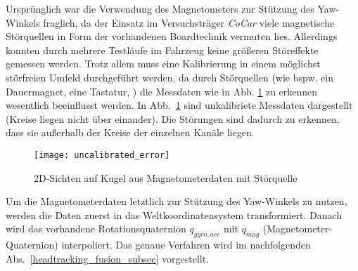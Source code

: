 Ursprünglich war die Verwendung des Magnetometers zur Stützung des Yaw-Winkels fraglich, da der Einsatz im Versuchsträger \emph{CoCar} viele magnetische Störquellen in Form der vorhandenen Boardtechnik vermuten lies. 
Allerdings konnten durch mehrere Testläufe im Fahrzeug keine größeren Störeffekte gemessen werden. Trotz allem muss eine Kalibrierung in einem möglichst störfreien Umfeld durchgeführt werden, da durch Störquellen (wie bspw. ein Dauermagnet, eine Tastatur, \oae) die Messdaten wie in Abb. \ref{fig:uncalibrated_error} zu erkennen wesentlich beeinflusst werden. In Abb.~\ref{fig:uncalibrated_error} sind unkalibriete Messdaten dargestellt (Kreise liegen nicht über einander). Die Störungen sind dadurch zu erkennen, dass sie außerhalb der Kreise der einzelnen Kanäle liegen.

\begin{figure}[ht]
	\centering
    \texttt{[image: uncalibrated\_error]}
	\caption[]{2D-Sichten auf Kugel aus Magnetometerdaten mit Störquelle}
	\label{fig:uncalibrated_error}
\end{figure}

Um die Magnetometerdaten letztlich zur Stützung des Yaw-Winkels zu nutzen, werden die Daten zuerst in das Weltkoordinatensystem transformiert.
Danach wird das vorhandene Rotationsquaternion $q_{gyro,acc}$ mit $q_{mag}$ (Magnetometer-Quaternion) interpoliert.
Das genaue Verfahren wird im nachfolgenden Abs.~\ref{headtracking_fusion_subsec} vorgestellt.
